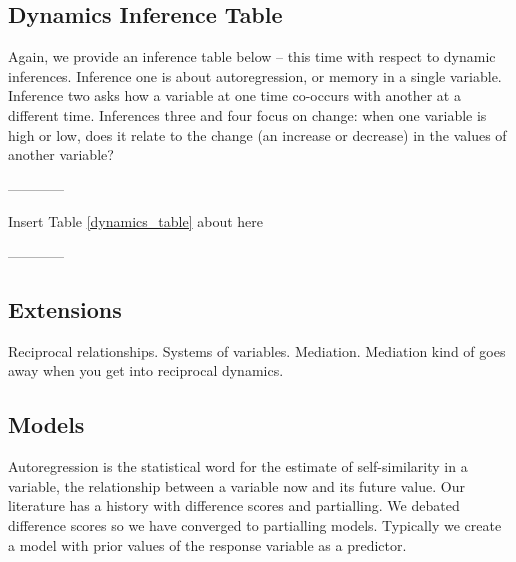 \documentclass[english,,man]{apa6}
\theoremstyle{definition}
\theoremstyle{definition}
\theoremstyle{definition}
\theoremstyle{remark}
\begin{document}
\hypertarget{dynamics-inference-table}{%
\subsection{Dynamics Inference Table}\label{dynamics-inference-table}}

Again, we provide an inference table below -- this time with respect to
dynamic inferences. Inference one is about autoregression, or memory in
a single variable. Inference two asks how a variable at one time
co-occurs with another at a different time. Inferences three and four
focus on change: when one variable is high or low, does it relate to the
change (an increase or decrease) in the values of another variable?

\begin{center}

------------

Insert Table \ref{dynamics_table} about here

------------

\end{center}

\hypertarget{extensions}{%
\subsection{Extensions}\label{extensions}}

Reciprocal relationships. Systems of variables. Mediation. Mediation
kind of goes away when you get into reciprocal dynamics.

\hypertarget{models-2}{%
\subsection{Models}\label{models-2}}

Autoregression is the statistical word for the estimate of
self-similarity in a variable, the relationship between a variable now
and its future value. Our literature has a history with difference
scores and partialling. We debated difference scores so we have
converged to partialling models. Typically we create a model with prior
values of the response variable as a predictor.
\end{document}
